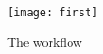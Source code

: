 \documentclass[../mcmpaper]{subfiles}
\begin{document}
    \begin{figure}[!ht]
    \centering
    \texttt{[image: first]}
    \caption{The workflow}
    \label{fig:first}
    \end{figure}
\end{document}
